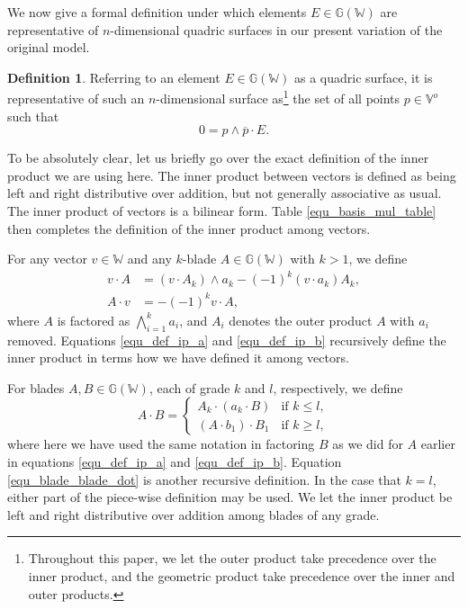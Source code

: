 \documentclass{birkjour}
\theoremstyle{definition}
\newtheorem{defn}[thm]{Definition}
\theoremstyle{remark}
\numberwithin{equation}{section}
\newcommand{\G}{\mathbb{G}}
\newcommand{\V}{\mathbb{V}}
\newcommand{\W}{\mathbb{W}}
\begin{document}
We now give a formal definition under which elements $E\in\G(\W)$
are representative of $n$-dimensional quadric surfaces in our present variation
of the original model.
\begin{defn}\label{def_quadric}
Referring to an element $E\in\G(\W)$ as a quadric surface, it is representative of such an $n$-dimensional surface as\footnote{Throughout this paper, we let the outer product take precedence
over the inner product, and the geometric product take precedence over the inner and
outer products.} the set of all points $p\in\V^o$ such that
\begin{equation}\label{equ_quadric_equation}
0 = p\wedge\overline{p}\cdot E.
\end{equation}
\end{defn}
To be absolutely clear, let us briefly go over the exact definition of the inner product
we are using here.  The inner product between vectors is defined as being left
and right distributive over addition, but not generally associative as usual.
The inner product of vectors is a bilinear form.
Table \eqref{equ_basis_mul_table} then completes the definition of the inner product among vectors.

For any vector $v\in\W$ and any $k$-blade $A\in\G(\W)$ with $k>1$, we define
\begin{align}
v\cdot A &= (v\cdot A_k)\wedge a_k-(-1)^k(v\cdot a_k)A_k,\label{equ_def_ip_a} \\
A\cdot v &=-(-1)^kv\cdot A,\label{equ_def_ip_b}
\end{align}
where $A$ is factored as $\bigwedge_{i=1}^k a_i$, and $A_i$ denotes
the outer product $A$ with $a_i$ removed.  Equations \eqref{equ_def_ip_a} and \eqref{equ_def_ip_b}
recursively define the inner product in terms how we have defined it among vectors.

For blades $A,B\in\G(\W)$, each of grade $k$ and $l$, respectively, we define
\begin{equation}\label{equ_blade_blade_dot}
A\cdot B = \left\{
\begin{array}{ll}
A_k\cdot (a_k\cdot B) & \mbox{if $k\leq l$}, \\
(A\cdot b_1)\cdot B_1 & \mbox{if $k\geq l$},
\end{array}
\right.
\end{equation}
where here we have used the same notation in factoring $B$ as we
did for $A$ earlier in equations \eqref{equ_def_ip_a} and \eqref{equ_def_ip_b}.
Equation \eqref{equ_blade_blade_dot} is another recursive definition.  In the
case that $k=l$, either part of the piece-wise definition may be used.
We let the inner product be left and right distributive over addition among
blades of any grade.
\end{document}
